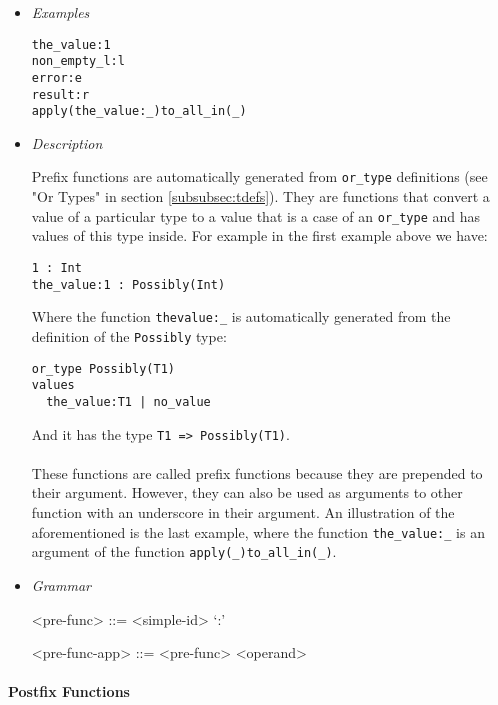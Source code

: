 \documentclass{article}
\begin{document}
\begin{itemize}

\item \textit{Examples}
\begin{verbatim}
the_value:1
non_empty_l:l
error:e
result:r
apply(the_value:_)to_all_in(_)
\end{verbatim}

\item \textit{Description}

Prefix functions are automatically generated from \verb|or_type| definitions
(see "Or Types" in section \ref{subsubsec:tdefs}). They are functions that
convert a value of a particular type to a value that is a case of an
\verb|or_type| and has values of this type inside. For example in the
first example above we have:
\begin{verbatim}
1 : Int
the_value:1 : Possibly(Int)
\end{verbatim}
Where the function \verb|thevalue:_| is automatically generated from the
definition of the \verb|Possibly| type:
\begin{verbatim}
or_type Possibly(T1)
values
  the_value:T1 | no_value
\end{verbatim}
And it has the type \verb|T1 => Possibly(T1)|.
\\\\
These functions are called prefix functions because they are prepended to
their argument. However, they can also be used as arguments to other function
with an underscore in their argument.
An illustration of the aforementioned is the last example, where the function
\verb|the_value:_| is an argument of the function \verb|apply(_)to_all_in(_)|.

\item \textit{Grammar}
\begin{grammar}
<pre-func> ::= <simple-id> `:'

<pre-func-app> ::= <pre-func> <operand>
\end{grammar}

\end{itemize}

\newpage
\paragraph{Postfix Functions}
\end{document}

